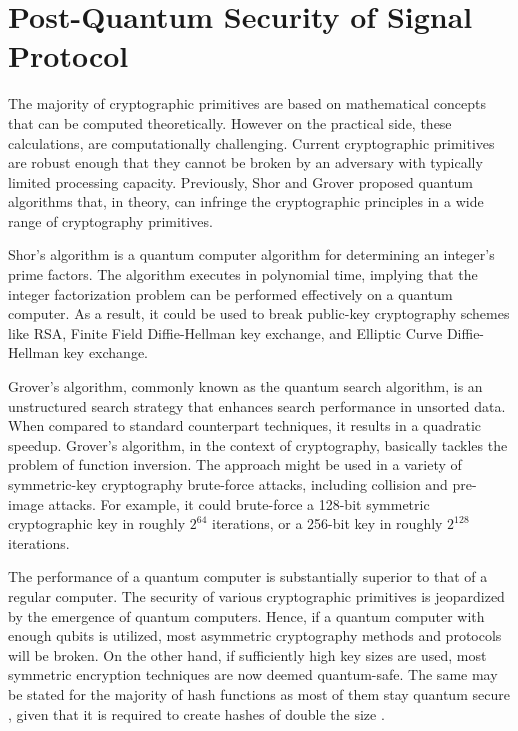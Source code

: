 \section{Post-Quantum Security of Signal Protocol}
The majority of cryptographic primitives are based on mathematical concepts that can be computed theoretically. However on the practical side, these calculations, are computationally challenging. Current cryptographic primitives are robust enough that they cannot be broken by an adversary with typically limited processing capacity. Previously, Shor \cite{shor94} and Grover \cite{gro96} proposed quantum algorithms that, in theory, can infringe the cryptographic principles in a wide range of cryptography primitives.
\par
Shor's algorithm is a quantum computer algorithm for determining an integer's prime factors. The algorithm executes in polynomial time, implying that the integer factorization problem can be performed effectively on a quantum computer. As a result, it could be used to break public-key cryptography schemes like RSA, Finite Field Diffie-Hellman key exchange, and Elliptic Curve Diffie-Hellman key exchange.
\par
Grover's algorithm, commonly known as the quantum search algorithm, is an unstructured search strategy that enhances search performance in unsorted data. When compared to standard counterpart techniques, it results in a quadratic speedup. Grover's algorithm, in the context of cryptography, basically tackles the problem of function inversion. The approach might be used in a variety of symmetric-key cryptography brute-force attacks, including collision and pre-image attacks. For example, it could brute-force a 128-bit symmetric cryptographic key in roughly $ 2^{64} $ iterations, or a 256-bit key in roughly $ 2^{128} $ iterations.
\par
The performance of a quantum computer is substantially superior to that of a regular computer. The security of various cryptographic primitives is jeopardized by the emergence of quantum computers. Hence, if a quantum computer with enough qubits is utilized, most asymmetric cryptography methods and protocols will be broken. On the other hand, if sufficiently high key sizes are used, most symmetric encryption techniques are now deemed quantum-safe. The same may be stated for the majority of hash functions as most of them stay quantum secure \cite{ber09}, given that it is required to create hashes of double the size \cite{bra+98}.
\par
